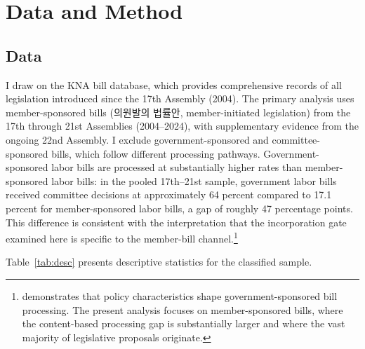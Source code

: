 \documentclass[11pt]{article}
\begin{document}

\section{Data and Method}
\label{sec:method}

\subsection{Data}
\label{sec:data}

I draw on the KNA bill database, which provides comprehensive records of all legislation introduced since the 17th Assembly (2004). The primary analysis uses member-sponsored bills (의원발의 법률안, member-initiated legislation) from the 17th through 21st Assemblies (2004--2024), with supplementary evidence from the ongoing 22nd Assembly. I exclude government-sponsored and committee-sponsored bills, which follow different processing pathways. Government-sponsored labor bills are processed at substantially higher rates than member-sponsored labor bills: in the pooled 17th--21st sample, government labor bills received committee decisions at approximately 64 percent compared to 17.1 percent for member-sponsored labor bills, a gap of roughly 47 percentage points. This difference is consistent with the interpretation that the incorporation gate examined here is specific to the member-bill channel.\footnote{\citet{lee2021} demonstrates that policy characteristics shape government-sponsored bill processing. The present analysis focuses on member-sponsored bills, where the content-based processing gap is substantially larger and where the vast majority of legislative proposals originate.}

Table~\ref{tab:desc} presents descriptive statistics for the classified sample.
\end{document}
